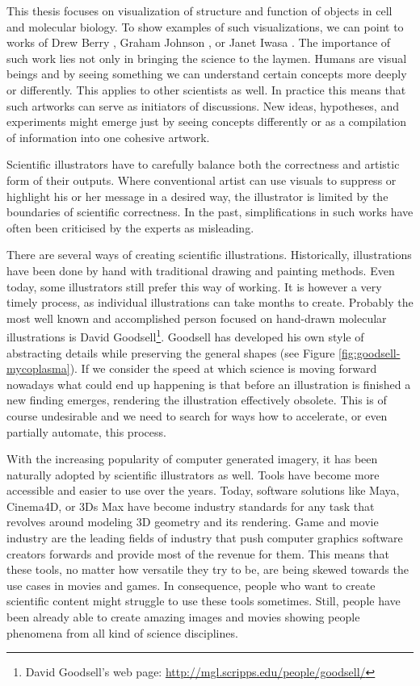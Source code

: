 \documentclass[
  digital, %
  table,   %
  nolof,     %
  nolot,     %
  oneside,
]{fithesis3}
\begin{document}
This thesis focuses on visualization of structure and function of objects in cell and molecular biology. To show examples of such visualizations, we can point to works of Drew Berry \cite{DrewBerryMovies}, Graham Johnson \cite{GrahamCellVideo}, or Janet Iwasa \cite{iwasa2010animating}. The importance of such work lies not only in bringing the science to the laymen. Humans are visual beings and by seeing something we can understand certain concepts more deeply or differently. This applies to other scientists as well. In practice this means that such artworks can serve as initiators of discussions. New ideas, hypotheses, and experiments might emerge just by seeing concepts differently or as a compilation of information into one cohesive artwork.

Scientific illustrators have to carefully balance both the correctness and artistic form of their outputs. Where conventional artist can use visuals to suppress or highlight his or her message in a desired way, the illustrator is limited by the boundaries of scientific correctness. In the past, simplifications in such works have often been criticised by the experts as misleading.

There are several ways of creating scientific illustrations. Historically, illustrations have been done by hand with traditional drawing and painting methods. Even today, some illustrators still prefer this way of working. It is however a very timely process, as individual illustrations can take months to create. Probably the most well known and accomplished person focused on hand-drawn molecular illustrations is David Goodsell\footnote{
  David Goodsell's web page: \url{http://mgl.scripps.edu/people/goodsell/}
}. Goodsell has developed his own style of abstracting details while preserving the general shapes (see Figure \ref{fig:goodsell-mycoplasma}). If we consider the speed at which science is moving forward nowadays what could end up happening is that before an illustration is finished a new finding emerges, rendering the illustration effectively obsolete. This is of course undesirable and we need to search for ways how to accelerate, or even partially automate, this process.

With the increasing popularity of computer generated imagery, it has been naturally adopted by scientific illustrators as well. Tools have become more accessible and easier to use over the years. Today, software solutions like Maya, Cinema4D, or 3Ds Max have become industry standards for any task that revolves around modeling 3D geometry and its rendering. Game and movie industry are the leading fields of industry that push computer graphics software creators forwards and provide most of the revenue for them. This means that these tools, no matter how versatile they try to be, are being skewed towards the use cases in movies and games. In consequence, people who want to create scientific content might struggle to use these tools sometimes. Still, people have been already able to create amazing images and movies showing people phenomena from all kind of science disciplines.
\end{document}
